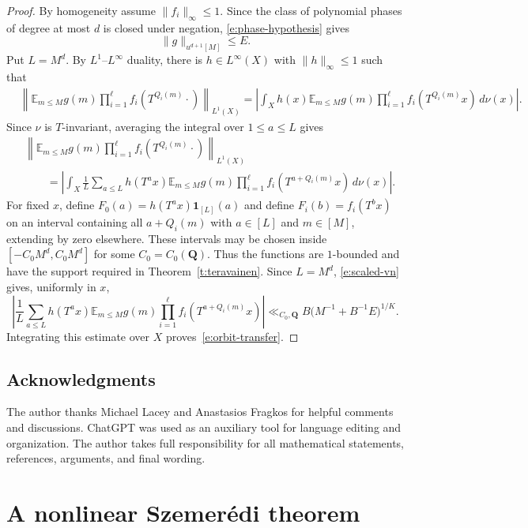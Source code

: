 \documentclass{amsart}
\newcommand{\E}{\mathbb E}
\newcommand{\1}{\mathbf 1}
\begin{document}
\begin{proof}
By homogeneity assume $\|f_i\|_\infty\leq1$.  Since the
class of polynomial phases of degree at most $d$ is closed under
negation, \eqref{e:phase-hypothesis} gives
\[
 \|g\|_{u^{d+1}[M]}\leq E.
\]
Put $L=M^d$.  By $L^1$--$L^\infty$ duality, there is
$h\in L^\infty(X)$ with $\|h\|_\infty\leq1$ such that
\begin{align*}
 &\left\|\E_{m\leq M}g(m)
   \prod_{i=1}^{\ell}f_i(T^{Q_i(m)}\cdot)\right\|_{L^1(X)}=
 \left|\int_X h(x)\E_{m\leq M}g(m)
   \prod_{i=1}^{\ell}f_i(T^{Q_i(m)}x)\,d\nu(x)\right|.
\end{align*}
Since $\nu$ is $T$-invariant, averaging the integral over
$1\leq a\leq L$ gives
\begin{align*}
 &\left\|\E_{m\leq M}g(m)
   \prod_{i=1}^{\ell}f_i(T^{Q_i(m)}\cdot)\right\|_{L^1(X)}\\
 &\qquad=
 \left|\int_X\frac1L\sum_{a\leq L}h(T^ax)
   \E_{m\leq M}g(m)
   \prod_{i=1}^{\ell}f_i(T^{a+Q_i(m)}x)\,d\nu(x)\right|.
\end{align*}
For fixed $x$, define $F_0(a)=h(T^ax)\1_{[L]}(a)$ and define
$F_i(b)=f_i(T^bx)$ on an interval containing all $a+Q_i(m)$ with
$a\in[L]$ and $m\in[M]$, extending by zero elsewhere.  These intervals
may be chosen inside $[-C_0M^d,C_0M^d]$ for some
$C_0=C_0(\mathbf Q)$.  Thus the functions are $1$-bounded and have the
support required in Theorem~\ref{t:teravainen}.  Since $L=M^d$,
\eqref{e:scaled-vn} gives, uniformly in $x$,
\[
 \left|\frac1L\sum_{a\leq L}h(T^ax)\E_{m\leq M}g(m)
 \prod_{i=1}^{\ell}f_i(T^{a+Q_i(m)}x)\right|
 \ll_{C_0,\mathbf Q}B\bigl(M^{-1}+B^{-1}E\bigr)^{1/K}.
\]
Integrating this estimate over $X$ proves~\eqref{e:orbit-transfer}.
\end{proof}





\subsection*{Acknowledgments}
The author thanks Michael Lacey and Anastasios Fragkos for helpful
comments and discussions.  ChatGPT was used as an auxiliary tool for
language editing and organization.  The author takes full responsibility
for all mathematical statements, references, arguments, and final wording.


\section{A nonlinear Szemer\'edi theorem}
\end{document}
